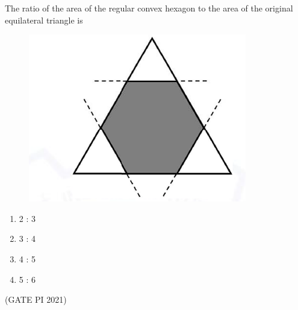 \documentclass[journal,12pt,onecolumn]{IEEEtran}
\theoremstyle{remark}
\begin{document}
\begin{enumerate}
The ratio of the area of the regular convex hexagon to the area of the original equilateral triangle is

\begin{figure}[H]
    \centering
    \includegraphics[width=0.5\columnwidth]{figs/fig3.png}
    \caption{}
    \label{fig:placeholder}
\end{figure} 


\begin{multicols}{4}
\begin{enumerate}
\item 2 : 3
\item 3 : 4
\item 4 : 5
\item 5 : 6
\end{enumerate}
\end{multicols}

\hfill (GATE PI 2021)

\end{enumerate}
\end{document}
